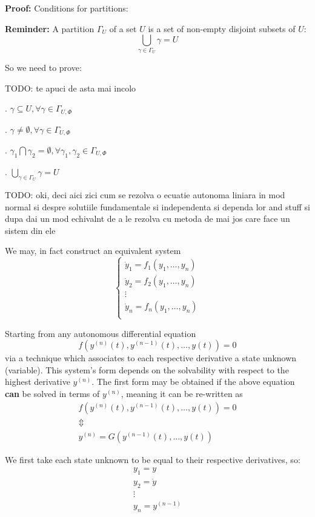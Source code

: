 \textbf{Proof:}
Conditions for partitions:
\par \textbf{Reminder:} A partition $\Gamma_U$ of a set $U$ is a set of non-empty disjoint subsets of $U$:
\[
  \bigcup_{\gamma\in \Gamma_U} \gamma = U
\]

So we need to prove:

TODO: te apuci de asta mai incolo \par
{}. $\gamma \subseteq U, \forall \gamma \in \Gamma_{U,\Phi}$ \par
{}. $ \gamma \neq \emptyset, \forall \gamma \in \Gamma_{U,\Phi}$ \par
{}. $\gamma_1 \bigcap \gamma_2 = \emptyset, \forall \gamma_1, \gamma_2 \in \Gamma_{U,\Phi}$ \par
{}. $\bigcup_{\gamma\in \Gamma_U} \gamma = U$ \par

TODO: oki, deci aici zici cum se rezolva o ecuatie autonoma liniara in mod normal si despre solutiile fundamentale si independenta si dependa lor and stuff si dupa dai un mod echivalnt de a le rezolva cu metoda de mai jos care face un sistem din ele

We may, in fact construct an equivalent system
\[
  \begin{cases}
    \dot{y}_1 = f_1(y_1,\dots, y_n) \\
    \dot{y}_2 = f_2(y_1,\dots, y_n) \\
    \vdots                          \\
    \dot{y}_n = f_n(y_1,\dots, y_n) \\
  \end{cases}
\]

Starting from any autonomous differential equation
\[
  f(y^{(n)}(t), y^{(n-1)}(t), \dots, y(t))= 0
\]
via a technique which associates to each respective derivative a state unknown (variable).
This system's form depends on the solvability with respect to the highest derivative $y^{(n)}$.
The first form may be obtained if the above equation \textbf{can} be solved in terms of $y^{(n)}$, meaning it can be re-written as
\begin{gather*}
  f(y^{(n)}(t), y^{(n-1)}(t), \dots, y(t))= 0 \\
  \Updownarrow \\
  y^{(n)}  = G(y^{(n-1)}(t), \dots, y(t))
\end{gather*}

We first take each state unknown to be equal to their respective derivatives, so:
\begin{gather*}
  y_1 = y     \\
  y_2 = \dot{y} \\
  \vdots \\
  y_n = y^{(n-1)}
\end{gather*}


